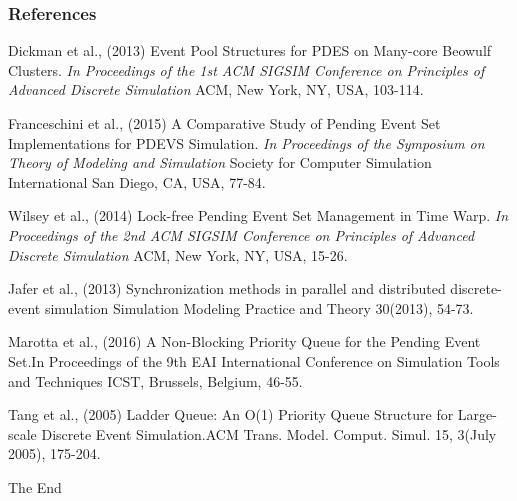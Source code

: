 \documentclass[table]{beamer}
\begin{document}
\begin{frame}
\frametitle{References}
\footnotesize{
\begin{thebibliography}{99}\vspace*{-3.5mm}
 Dickman et al., (2013) Event Pool Structures for PDES on Many-core Beowulf Clusters. \emph{In Proceedings of the 1st ACM SIGSIM Conference on Principles of Advanced Discrete Simulation} ACM, New York, NY, USA, 103-114.

 Franceschini et al., (2015) A Comparative Study of Pending Event Set Implementations for PDEVS Simulation. \emph{In Proceedings of the Symposium on Theory of Modeling and Simulation} Society for Computer Simulation International San Diego, CA, USA, 77-84.

 Wilsey et al., (2014) Lock-free Pending Event Set Management in Time Warp. \emph{In Proceedings of the 2nd ACM SIGSIM Conference on Principles of Advanced Discrete Simulation} ACM, New York, NY, USA, 15-26.

 Jafer et al., (2013) Synchronization methods in parallel and distributed discrete-event simulation{ Simulation Modeling Practice and Theory} 30(2013), 54-73.

 Marotta et al., (2016) A Non-Blocking Priority Queue for the Pending Event Set.{In Proceedings of the 9th EAI International Conference on Simulation Tools and Techniques} ICST, Brussels, Belgium, 46-55.

 Tang et al., (2005) Ladder Queue: An O(1) Priority Queue Structure for Large-scale Discrete Event Simulation.{ACM Trans. Model. Comput. Simul.} 15, 3(July 2005), 175-204.
\end{thebibliography}
}
\end{frame}


\begin{frame}
\Huge{\centerline{The End}}
\end{frame}
\end{document}
